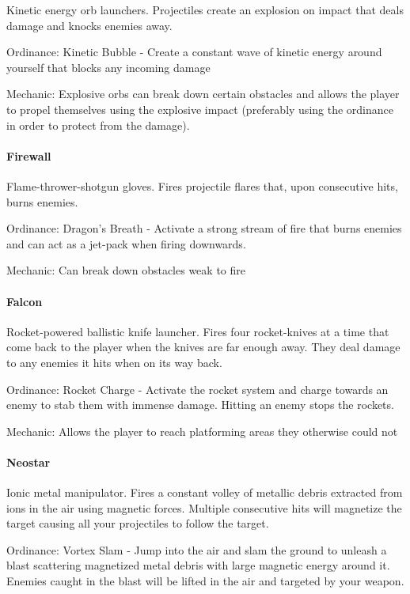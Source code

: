 \documentclass[../Main.tex]{subfiles}
\begin{document}
Kinetic energy orb launchers. Projectiles create an explosion on impact that deals damage and knocks enemies away. 

Ordinance: Kinetic Bubble - Create a constant wave of kinetic energy around yourself that blocks any incoming damage

Mechanic: Explosive orbs can break down certain obstacles and allows the player to propel themselves using the explosive impact (preferably using the ordinance in order to protect from the damage).

\paragraph{Firewall}

Flame-thrower-shotgun gloves. Fires projectile flares that, upon consecutive hits, burns enemies.

Ordinance: Dragon's Breath - Activate a strong stream of fire that burns enemies and can act as a jet-pack when firing downwards.

Mechanic: Can break down obstacles weak to fire

\paragraph{Falcon}

Rocket-powered ballistic knife launcher. Fires four rocket-knives at a time that come back to the player when the knives are far enough away. They deal damage to any enemies it hits when on its way back.

Ordinance: Rocket Charge - Activate the rocket system and charge towards an enemy to stab them with immense damage. Hitting an enemy stops the rockets. 

Mechanic: Allows the player to reach platforming areas they otherwise could not

\paragraph{Neostar}

Ionic metal manipulator. Fires a constant volley of metallic debris extracted from ions in the air using magnetic forces. Multiple consecutive hits will magnetize the target causing all your projectiles to follow the target.

Ordinance: Vortex Slam - Jump into the air and slam the ground to unleash a blast scattering magnetized metal debris with large magnetic energy around it. Enemies caught in the blast will be lifted in the air and targeted by your weapon.
\end{document}
